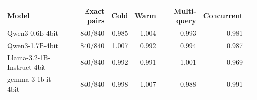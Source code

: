 \begin{tabular}{lrrrrrr}
\toprule
Model & Exact pairs & Cold & Warm & Multi-query & Concurrent \\
\midrule
Qwen3-0.6B-4bit & 840/840 & 0.985 & 1.004 & 0.993 & 0.981 \\
Qwen3-1.7B-4bit & 840/840 & 1.007 & 0.992 & 0.994 & 0.987 \\
Llama-3.2-1B-Instruct-4bit & 840/840 & 0.992 & 0.991 & 1.001 & 0.969 \\
gemma-3-1b-it-4bit & 840/840 & 0.998 & 1.007 & 0.988 & 0.991 \\
\bottomrule
\end{tabular}
